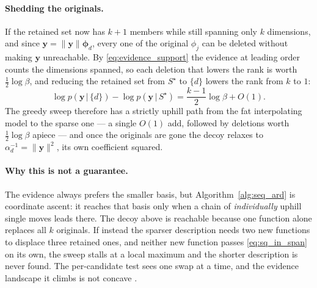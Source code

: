 \documentclass[a4paper]{article}
\renewcommand{\vec}[1]{\boldsymbol{#1}}
\begin{document}
\paragraph{Shedding the originals.} If the retained set now has $k+1$ members while still spanning only $k$ dimensions, and since $\mathbf y = \|\mathbf y\| \vec \phi_d$, every one of the original $\phi_j$ can be deleted without making $\mathbf y$ unreachable. By \eqref{eq:evidence_support} the evidence at leading order counts the dimensions spanned, so each deletion that lowers the rank is worth $\tfrac{1}{2} \log \beta$, and reducing the retained set from $S^\star$ to $\{d\}$ lowers the rank from $k$ to $1$:
\begin{equation} \label{eq:shed_gain}
    \log p(\mathbf y \,|\, \{d\}) - \log p(\mathbf y \,|\, S^\star) = \frac{k-1}{2} \log \beta + O(1).
\end{equation}
The greedy sweep therefore has a strictly uphill path from the fat interpolating model to the sparse one --- a single $O(1)$ add, followed by deletions worth $\tfrac{1}{2} \log \beta$ apiece --- and once the originals are gone the decoy relaxes to $\alpha_d^{-1} = \|\mathbf y\|^2$, its own coefficient squared.

\paragraph{Why this is not a guarantee.} The evidence always prefers the smaller basis, but Algorithm~\ref{alg:seq_ard} is coordinate ascent: it reaches that basis only when a chain of \emph{individually} uphill single moves leads there. The decoy above is reachable because one function alone replaces all $k$ originals. If instead the sparser description needs two new functions to displace three retained ones, and neither new function passes \eqref{eq:sq_in_span} on its own, the sweep stalls at a local maximum and the shorter description is never found. The per-candidate test sees one swap at a time, and the evidence landscape it climbs is not concave \autocite{wipf2008new}.

\printbibliography
\end{document}
